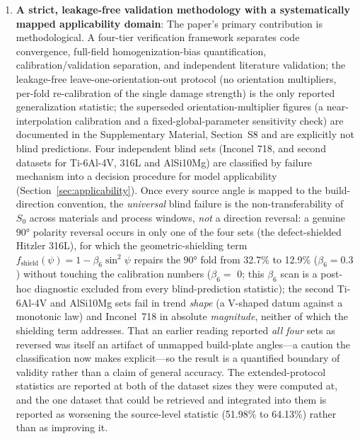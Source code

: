 \documentclass[twocolumn]{sagej}
\begin{document}
\begin{enumerate}\def\labelenumi{(\arabic{enumi})}
    \item \textbf{A strict, leakage-free validation methodology with a systematically mapped applicability domain}: The paper's primary contribution is methodological. A four-tier verification framework separates code convergence, full-field homogenization-bias quantification, calibration/validation separation, and independent literature validation; the leakage-free leave-one-orientation-out protocol (no orientation multipliers, per-fold re-calibration of the single damage strength) is the only reported generalization statistic; the superseded orientation-multiplier figures (a near-interpolation calibration and a fixed-global-parameter sensitivity check) are documented in the Supplementary Material, Section~S8 and are explicitly not blind predictions. Four independent blind sets (Inconel 718, and second datasets for Ti-6Al-4V, 316L and AlSi10Mg) are classified by failure mechanism into a decision procedure for model applicability (Section~\ref{sec:applicability}). Once every source angle is mapped to the build-direction convention, the \emph{universal} blind failure is the non-transferability of $S_0$ across materials and process windows, \emph{not} a direction reversal: a genuine $\ang{90}$ polarity reversal occurs in only one of the four sets (the defect-shielded Hitzler 316L), for which the geometric-shielding term $f_{\text{shield}}(\psi) = 1 - \beta_6 \sin^2\psi$ repairs the $\ang{90}$ fold from 32.7\% to 12.9\% ($\beta_6 = 0.3$) without touching the calibration numbers ($\beta_6 = $ 0; this $\beta_6$ scan is a post-hoc diagnostic excluded from every blind-prediction statistic); the second Ti-6Al-4V and AlSi10Mg sets fail in trend \emph{shape} (a V-shaped datum against a monotonic law) and Inconel~718 in absolute \emph{magnitude}, neither of which the shielding term addresses. That an earlier reading reported \emph{all four} sets as reversed was itself an artifact of unmapped build-plate angles---a caution the classification now makes explicit---so the result is a quantified boundary of validity rather than a claim of general accuracy. The extended-protocol statistics are reported at both of the dataset sizes they were computed at, and the one dataset that could be retrieved and integrated into them is reported as worsening the source-level statistic (51.98\% to 64.13\%) rather than as improving it.
    

\end{enumerate}
\end{document}
